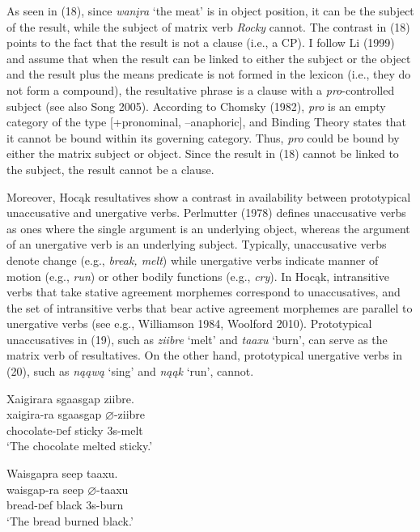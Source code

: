 \documentclass[output=paper]{LSP/langsci}
\begin{document}
As seen in (18), since \textit{wan\k{i}ra} `the meat' is in object position, it can be the subject of the result, while the subject of matrix verb \textit{Rocky} cannot. The contrast in (18) points to the fact that the result is not a clause (i.e., a CP). I follow Li (1999) and assume that when the result can be linked to either the subject or the object and the result plus the means predicate is not formed in the lexicon (i.e., they do not form a compound), the resultative phrase is a clause with a \textit{pro}-controlled subject (see also Song 2005). According to Chomsky (1982), \textit{pro} is an empty category of the type [+pronominal, --anaphoric], and Binding Theory states that it cannot be bound within its governing category. Thus, \textit{pro} could be bound by either the matrix subject or object. Since the result in (18) cannot be linked to the subject, the result cannot be a clause.

Moreover, Hoc\k{a}k resultatives show a contrast in availability between prototypical unaccusative and unergative verbs. Perlmutter (1978) defines unaccusative verbs as ones where the single argument is an underlying object, whereas the argument of an unergative verb is an underlying subject. Typically, unaccusative verbs denote change (e.g., \textit{break, melt}) while unergative verbs indicate manner of motion (e.g., \textit{run}) or other bodily functions (e.g., \textit{cry}). In Hoc\k{a}k, intransitive verbs that take stative agreement morphemes correspond to unaccusatives, and the set of intransitive verbs that bear active agreement morphemes are parallel to unergative verbs (see e.g., Williamson 1984, Woolford 2010). Prototypical unaccusatives in (19), such as \textit{ziibre} `melt' and \textit{taaxu} `burn', can serve as the matrix verb of resultatives. On the other hand, prototypical unergative verbs in (20), such as \textit{n\k{a}\k{a}w\k{a}} `sing' and \textit{n\k{a}\k{a}k} `run', cannot.

\begin{exe}
\ex
\begin{xlist}

\ex \glll Xaigirara sgaasgap {ziibre}. \\
 xaigira-ra sgaasgap $\varnothing$-ziibre\\
chocolate-{\textsc def} sticky {\textsc 3s}-melt\\
\glt `The chocolate melted sticky.'

\ex \glll Waisgapra seep {taaxu}.\\
 waisgap-ra seep $\varnothing$-taaxu\\
bread-{\textsc def} black {\textsc 3s}-burn\\
\glt `The bread burned black.'

\end{xlist}
\end{exe}
\end{document}
